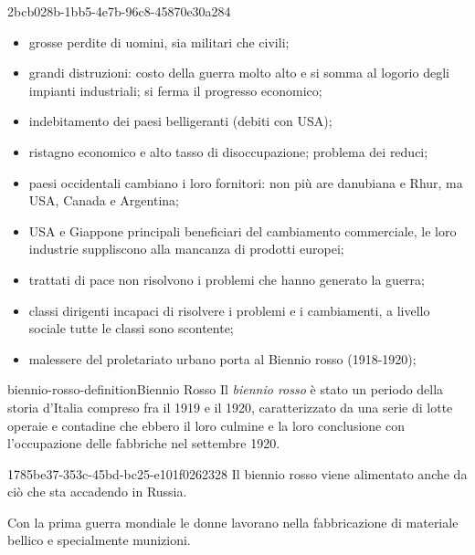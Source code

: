 \documentclass[preview]{standalone}
\begin{document}
\begin{snippet}{2bcb028b-1bb5-4e7b-96c8-45870e30a284}
    \begin{itemize}
        \item grosse perdite di uomini, sia militari che civili;
        \item grandi distruzioni: costo della guerra molto alto e si somma al logorio
            degli impianti industriali; si ferma il progresso economico;
        \item indebitamento dei paesi belligeranti (debiti con USA);
        \item ristagno economico e alto tasso di disoccupazione; problema dei reduci;
        \item paesi occidentali cambiano i loro fornitori: non più are danubiana
            e Rhur, ma USA, Canada e Argentina;
        \item USA e Giappone principali beneficiari del cambiamento
            commerciale, le loro industrie suppliscono alla mancanza di prodotti europei;
        \item trattati di pace non risolvono i problemi che hanno generato la guerra;
        \item classi dirigenti incapaci di risolvere i problemi e i cambiamenti,
            a livello sociale tutte le classi sono scontente;
        \item malessere del proletariato urbano porta al Biennio rosso (1918-1920);
    \end{itemize}
\end{snippet}

\begin{snippetdefinition}{biennio-rosso-definition}{Biennio Rosso}
    Il \textit{biennio rosso} 
    è stato un periodo
    della storia d'Italia compreso fra il
    1919 e il 1920, caratterizzato da una serie
    di lotte operaie e contadine che ebbero il
    loro culmine e la loro conclusione con
    l'occupazione delle fabbriche nel settembre 1920.
\end{snippetdefinition}

\begin{snippet}{1785be37-353c-45bd-bc25-e101f0262328}
    Il biennio rosso viene alimentato anche da ciò che sta accadendo in Russia.

    Con la prima guerra mondiale le donne lavorano nella fabbricazione di materiale bellico e 
    specialmente munizioni.
\end{snippet}
\end{document}
